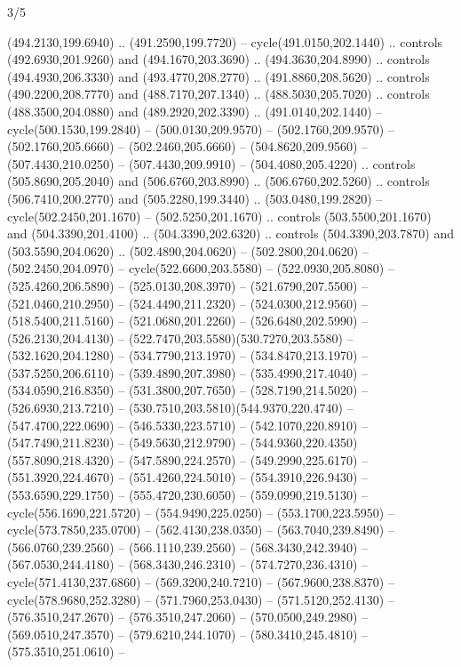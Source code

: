 \begin{flagdescription}{3/5}
\begin{scope}[shift={(0.5\flaglength,0.5\flagwidth)},scale=\flagwidth/1075]
\begin{scope}[y=0.80pt, x=0.80pt, yscale=-2.37, xscale=2.37,xshift=-402,yshift=-230.4]
  (494.2130,199.6940) .. (491.2590,199.7720) -- cycle(491.0150,202.1440) ..
  controls (492.6930,201.9260) and (494.1670,203.3690) .. (494.3630,204.8990) ..
  controls (494.4930,206.3330) and (493.4770,208.2770) .. (491.8860,208.5620) ..
  controls (490.2200,208.7770) and (488.7170,207.1340) .. (488.5030,205.7020) ..
  controls (488.3500,204.0880) and (489.2920,202.3390) .. (491.0140,202.1440) --
  cycle(500.1530,199.2840) -- (500.0130,209.9570) -- (502.1760,209.9570) --
  (502.1760,205.6660) -- (502.2460,205.6660) -- (504.8620,209.9560) --
  (507.4430,210.0250) -- (507.4430,209.9910) -- (504.4080,205.4220) .. controls
  (505.8690,205.2040) and (506.6760,203.8990) .. (506.6760,202.5260) .. controls
  (506.7410,200.2770) and (505.2280,199.3440) .. (503.0480,199.2820) --
  cycle(502.2450,201.1670) -- (502.5250,201.1670) .. controls
  (503.5500,201.1670) and (504.3390,201.4100) .. (504.3390,202.6320) .. controls
  (504.3390,203.7870) and (503.5590,204.0620) .. (502.4890,204.0620) --
  (502.2800,204.0620) -- (502.2450,204.0970) -- cycle(522.6600,203.5580) --
  (522.0930,205.8080) -- (525.4260,206.5890) -- (525.0130,208.3970) --
  (521.6790,207.5500) -- (521.0460,210.2950) -- (524.4490,211.2320) --
  (524.0300,212.9560) -- (518.5400,211.5160) -- (521.0680,201.2260) --
  (526.6480,202.5990) -- (526.2130,204.4130) --
  (522.7470,203.5580)(530.7270,203.5580) -- (532.1620,204.1280) --
  (534.7790,213.1970) -- (534.8470,213.1970) -- (537.5250,206.6110) --
  (539.4890,207.3980) -- (535.4990,217.4040) -- (534.0590,216.8350) --
  (531.3800,207.7650) -- (528.7190,214.5020) -- (526.6930,213.7210) --
  (530.7510,203.5810)(544.9370,220.4740) -- (547.4700,222.0690) --
  (546.5330,223.5710) -- (542.1070,220.8910) -- (547.7490,211.8230) --
  (549.5630,212.9790) -- (544.9360,220.4350)(557.8090,218.4320) --
  (547.5890,224.2570) -- (549.2990,225.6170) -- (551.3920,224.4670) --
  (551.4260,224.5010) -- (554.3910,226.9430) -- (553.6590,229.1750) --
  (555.4720,230.6050) -- (559.0990,219.5130) -- cycle(556.1690,221.5720) --
  (554.9490,225.0250) -- (553.1700,223.5950) -- cycle(573.7850,235.0700) --
  (562.4130,238.0350) -- (563.7040,239.8490) -- (566.0760,239.2560) --
  (566.1110,239.2560) -- (568.3430,242.3940) -- (567.0530,244.4180) --
  (568.3430,246.2310) -- (574.7270,236.4310) -- cycle(571.4130,237.6860) --
  (569.3200,240.7210) -- (567.9600,238.8370) -- cycle(578.9680,252.3280) --
  (571.7960,253.0430) -- (571.5120,252.4130) -- (576.3510,247.2670) --
  (576.3510,247.2060) -- (570.0500,249.2980) -- (569.0510,247.3570) --
  (579.6210,244.1070) -- (580.3410,245.4810) -- (575.3510,251.0610) --

\end{scope}
\end{scope}
\end{flagdescription}
